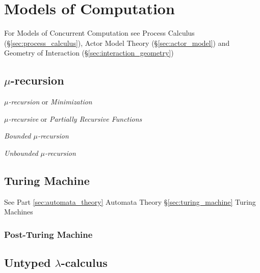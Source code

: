 \section{Models of Computation}\label{sec:computation_model}

\fist For Models of Concurrent Computation see Process Calculus
(\S\ref{sec:process_calculus}), Actor Model Theory
(\S\ref{sec:actor_model}) and Geometry of Interaction
(\S\ref{sec:interaction_geometry})



\subsection{$\mu$-recursion}\label{sec:mu_recursion}

\emph{$\mu$-recursion} or \emph{Minimization}

\emph{$\mu$-recursive} or \emph{Partially Recursive Functions}

\emph{Bounded $\mu$-recursion}

\emph{Unbounded $\mu$-recursion}



\subsection{Turing Machine}

See Part \ref{sec:automata_theory} Automata Theory
\S\ref{sec:turing_machine} Turing Machines



\subsubsection{Post-Turing Machine}\label{sec:post_turing}



\subsection{Untyped $\lambda$-calculus}\label{sec:untyped_lambda}

